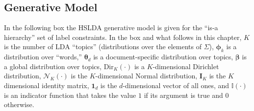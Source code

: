 

\subsection{Generative Model}

In the following box  the HSLDA generative model  is given for the ``is-a hierarchy'' set of label constraints.   In the box and what follows in this chapter, $K$ is the number of LDA
``topics'' (distributions over the elements of $\Sigma$), $\boldsymbol\phi_k$
is a distribution over ``words,'' $\boldsymbol\theta_d$ is a document-specific
distribution over topics, $\boldsymbol\beta$ is a global distribution over
topics, Dir$_{K}(\cdot)$ is a $K$-dimensional Dirichlet distribution,
$\mathcal{N}_{K}(\cdot)$ is the $K$-dimensional Normal distribution,
$\mathbf{I}_{K}$ is the $K$ dimensional identity matrix,  $\mathbf{1}_d$ is the
$d$-dimensional vector of all ones, and $\mathbb{I}(\cdot)$ is an indicator
function that takes the value $1$ if its argument is true and $0$ otherwise.



